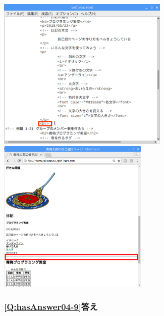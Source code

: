 \documentclass[a4paper,12pt]{jarticle}
\begin{document}
\centering
\includegraphics[width=8.186cm]{textbook-img237.png}
\includegraphics[width=7.163cm]{textbook-img238.png}
\flushleft

\bigskip


\bigskip

\clearpage\subsubsection{\bfseries
\ref*{Q:hasAnswer04-9}答え}



\centering
{}
\flushleft

\bigskip

\centering
{}
\flushleft
\end{document}
